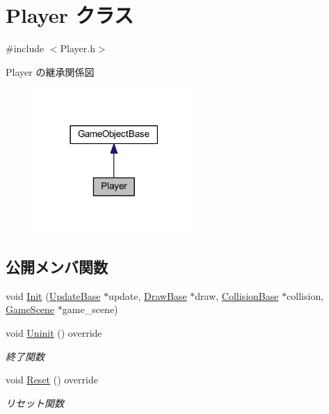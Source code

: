 \hypertarget{class_player}{}\section{Player クラス}
\label{class_player}


{\ttfamily \#include $<$Player.\+h$>$}



Player の継承関係図\nopagebreak
\begin{figure}[H]
\begin{center}
\leavevmode
\includegraphics[width=174pt]{class_player__inherit__graph}
\end{center}
\end{figure}
\subsection*{公開メンバ関数}
\begin{DoxyCompactItemize}
\item 
void \mbox{\hyperlink{class_player_a171167a4b1a6dddbe94b8f3c6f7462c4}{Init}} (\mbox{\hyperlink{class_update_base}{Update\+Base}} $\ast$update, \mbox{\hyperlink{class_draw_base}{Draw\+Base}} $\ast$draw, \mbox{\hyperlink{class_collision_base}{Collision\+Base}} $\ast$collision, \mbox{\hyperlink{class_game_scene}{Game\+Scene}} $\ast$game\+\_\+scene)
\item 
void \mbox{\hyperlink{class_player_a7455a83ac23d2f5e0cce0ddd7d92db0c}{Uninit}} () override
\begin{DoxyCompactList}\small\item\em 終了関数 \end{DoxyCompactList}\item 
void \mbox{\hyperlink{class_player_a457153d0edd58932e37e1356f5fe5fed}{Reset}} () override
\begin{DoxyCompactList}\small\item\em リセット関数 \end{DoxyCompactList}\end{DoxyCompactItemize}

